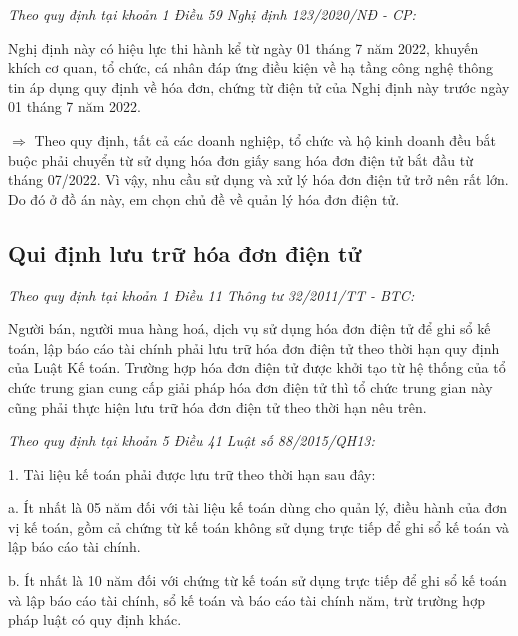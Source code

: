 \emph{Theo quy định tại khoản 1 Điều 59 Nghị định 123/2020/NĐ - CP:}


Nghị định này có hiệu lực thi hành kể từ ngày 01 tháng 7 năm 2022, khuyến khích cơ quan, tổ chức, cá nhân đáp ứng điều kiện về hạ tầng công nghệ thông tin áp dụng quy định về hóa đơn, chứng từ điện tử của Nghị định này trước ngày 01 tháng 7 năm 2022.



$\Rightarrow$ Theo quy định, tất cả các doanh nghiệp, tổ chức và hộ kinh doanh đều bắt buộc phải chuyển từ sử dụng hóa đơn giấy sang hóa đơn điện tử bắt đầu từ tháng 07/2022. Vì vậy, nhu cầu sử dụng và xử lý hóa đơn điện tử trở nên rất lớn. Do đó ở đồ án này, em chọn chủ đề về quản lý hóa đơn điện tử.

\subsection{Qui định lưu trữ hóa đơn điện tử}

\emph{Theo quy định tại khoản 1 Điều 11 Thông tư 32/2011/TT - BTC:}


Người bán, người mua hàng hoá, dịch vụ sử dụng hóa đơn điện tử để ghi sổ kế toán, lập báo cáo tài chính phải lưu trữ hóa đơn điện tử theo thời hạn quy định của Luật Kế toán. Trường hợp hóa đơn điện tử được khởi tạo từ hệ thống của tổ chức trung gian cung cấp giải pháp hóa đơn điện tử thì tổ chức trung gian này cũng phải thực hiện lưu trữ hóa đơn điện tử theo thời hạn nêu trên.


\emph{Theo quy định tại khoản 5 Điều 41 Luật số 88/2015/QH13:}


1. Tài liệu kế toán phải được lưu trữ theo thời hạn sau đây:

a. Ít nhất là 05 năm đối với tài liệu kế toán dùng cho quản lý, điều hành của đơn vị kế toán, gồm cả chứng từ kế toán không sử dụng trực tiếp để ghi sổ kế toán và lập báo cáo tài chính.

b. Ít nhất là 10 năm đối với chứng từ kế toán sử dụng trực tiếp để ghi sổ kế toán và lập báo cáo tài chính, sổ kế toán và báo cáo tài chính năm, trừ trường hợp pháp luật có quy định khác.

